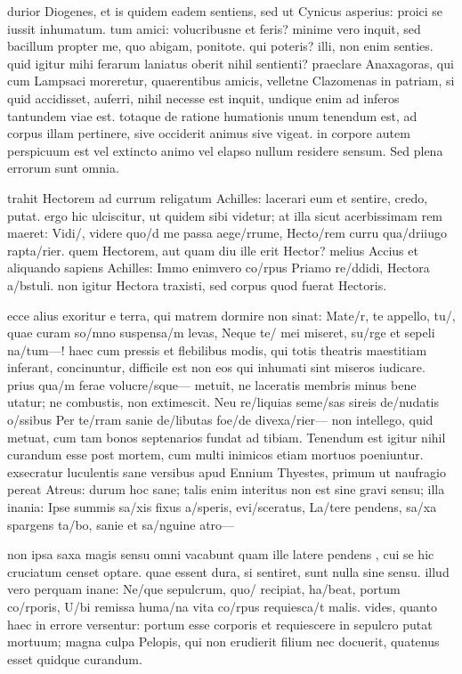  durior Diogenes, et is quidem eadem sentiens, sed ut Cynicus asperius: proici se iussit inhumatum. tum amici: volucribusne et feris? minime vero inquit, sed bacillum propter me, quo abigam, ponitote. qui poteris? illi, non enim senties. quid igitur mihi ferarum laniatus oberit nihil sentienti? praeclare Anaxagoras, qui cum Lampsaci moreretur, quaerentibus amicis, velletne Clazomenas in patriam, si quid accidisset, auferri, nihil necesse est inquit, undique enim ad inferos tantundem viae est. totaque de ratione humationis unum tenendum est, ad corpus illam pertinere, sive occiderit animus sive vigeat. in corpore autem perspicuum est vel extincto animo vel elapso nullum residere sensum. Sed plena errorum sunt omnia.

 trahit Hectorem ad currum religatum Achilles: lacerari eum et sentire, credo, putat. ergo hic ulciscitur, ut quidem sibi videtur; at illa sicut acerbissimam rem maeret: Vidi/, videre quo/d me passa aege/rrume, Hecto/rem curru qua/driiugo rapta/rier. quem Hectorem, aut quam diu ille erit Hector? melius Accius et aliquando sapiens Achilles: Immo enimvero co/rpus Priamo re/ddidi, Hectora a/bstuli. non igitur Hectora traxisti, sed corpus quod fuerat Hectoris.

 ecce alius exoritur e terra, qui matrem dormire non sinat: Mate/r, te appello, tu/, quae curam so/mno suspensa/m levas, Neque te/ mei miseret, su/rge et sepeli na/tum—! haec cum pressis et flebilibus modis, qui totis theatris maestitiam inferant, concinuntur, difficile est non eos qui inhumati sint miseros iudicare. prius qua/m ferae volucre/sque— metuit, ne laceratis membris minus bene utatur; ne combustis, non extimescit. Neu re/liquias seme/sas sireis de/nudatis o/ssibus Per te/rram sanie de/libutas foe/de divexa/rier— non intellego, quid metuat, cum tam bonos septenarios fundat ad tibiam. Tenendum est igitur nihil curandum esse post mortem, cum multi inimicos etiam mortuos poeniuntur. exsecratur luculentis sane versibus apud Ennium Thyestes, primum ut naufragio pereat Atreus: durum hoc sane; talis enim interitus non est sine gravi sensu; illa inania: Ipse summis sa/xis fixus a/speris, evi/sceratus, La/tere pendens, sa/xa spargens ta/bo, sanie et sa/nguine atro—

 non ipsa saxa magis sensu omni vacabunt quam ille latere pendens , cui se hic cruciatum censet optare. quae essent dura, si sentiret, sunt nulla sine sensu. illud vero perquam inane: Ne/que sepulcrum, quo/ recipiat, ha/beat, portum co/rporis, U/bi remissa huma/na vita co/rpus requiesca/t malis. vides, quanto haec in errore versentur: portum esse corporis et requiescere in sepulcro putat mortuum; magna culpa Pelopis, qui non erudierit filium nec docuerit, quatenus esset quidque curandum.

